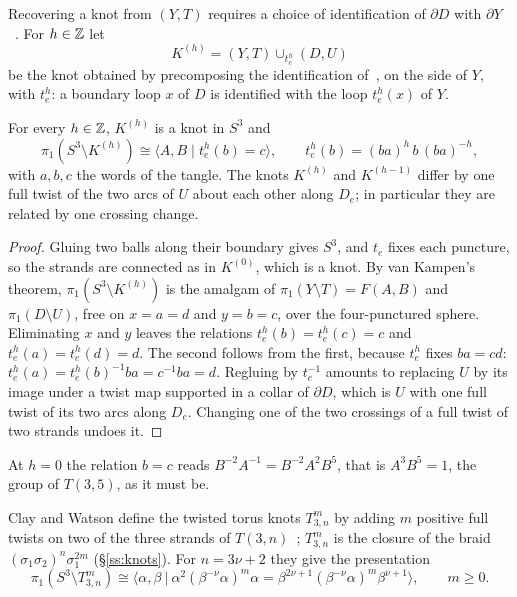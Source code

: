 Recovering a knot from $(Y,T)$ requires a choice of identification of $\partial D$ with $\partial Y$~\cite[after (17)]{HHK2}.
For $h\in\mathbb{Z}$ let
\[
K^{(h)}=(Y,T)\cup_{t_e^h}(D,U)
\]
be the knot obtained by precomposing the identification of~\cite[(17)]{HHK2}, on the side of $Y$, with $t_e^h$: a
boundary loop $x$ of $D$ is identified with the loop $t_e^h(x)$ of $Y$.

\begin{lemma}\label{lem:group}
For every $h\in\mathbb{Z}$, $K^{(h)}$ is a knot in $S^3$ and
\[
\pi_1(S^3\setminus K^{(h)})\cong\langle A,B\mid t_e^h(b)=c\rangle,\qquad t_e^h(b)=(ba)^h\,b\,(ba)^{-h},
\]
with $a,b,c$ the words of the tangle. The knots $K^{(h)}$ and $K^{(h-1)}$ differ by one full twist of the two arcs
of $U$ about each other along $D_e$; in particular they are related by one crossing change.
\end{lemma}

\begin{proof}
Gluing two balls along their boundary gives $S^3$, and $t_e$ fixes each puncture, so the strands are connected as
in $K^{(0)}$, which is a knot. By van Kampen's theorem, $\pi_1(S^3\setminus K^{(h)})$ is the amalgam of
$\pi_1(Y\setminus T)=F(A,B)$ and $\pi_1(D\setminus U)$, free on $x=a=d$ and $y=b=c$, over the four-punctured sphere.
Eliminating $x$ and $y$ leaves the relations $t_e^h(b)=t_e^h(c)=c$ and $t_e^h(a)=t_e^h(d)=d$. The second follows from
the first, because $t_e^h$ fixes $ba=cd$: $t_e^h(a)=t_e^h(b)^{-1}ba=c^{-1}ba=d$. Regluing by $t_e^{-1}$ amounts to replacing
$U$ by its image under a twist map supported in a collar of $\partial D$, which is $U$ with one full twist of its two
arcs along $D_e$. Changing one of the two crossings of a full twist of two strands undoes it.
\end{proof}

At $h=0$ the relation $b=c$ reads $B^{-2}A^{-1}=B^{-2}A^2B^5$, that is $A^3B^5=1$, the group of $T(3,5)$, as it must be.

Clay and Watson define the twisted torus knots $T^m_{3,n}$ by adding $m$ positive full twists on two of the three
strands of $T(3,n)$~\cite[\S3.2]{ClayWatson}; $T^m_{3,n}$ is the closure of the braid $(\sigma_1\sigma_2)^n\sigma_1^{2m}$
(\S\ref{ss:knots}). For $n=3\nu+2$ they give the presentation~\cite[Prop.~22]{ClayWatson}
\begin{equation}\label{eq:CW}
\pi_1(S^3\setminus T^m_{3,n})\cong\bigl\langle\alpha,\beta\ \big|\ \alpha^2(\beta^{-\nu}\alpha)^m\alpha=\beta^{2\nu+1}(\beta^{-\nu}\alpha)^m\beta^{\nu+1}\bigr\rangle,
\qquad m\ge0 .
\end{equation}

